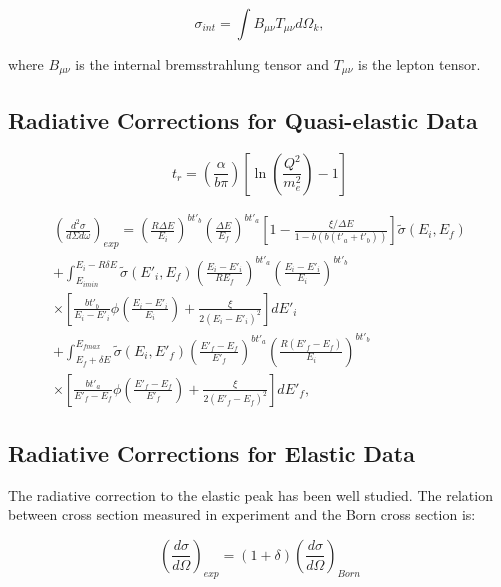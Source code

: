 \begin{equation}
\sigma_{int} = \int B_{\mu\nu} T_{\mu\nu} d\Omega_k,
\end{equation}

where $B_{\mu\nu}$ is the internal bremsstrahlung tensor and $T_{\mu\nu}$ is the lepton tensor.



\subsection{Radiative Corrections for Quasi-elastic Data}

\begin{equation}
t_r = \left(\frac{\alpha}{b\pi} \right) \left[ \ln\left(\frac{Q^2}{m_e^2}\right)-1 \right]
\end{equation}

\begin{equation}
\begin{split}
\left( \frac{d^2\sigma}{d\Sigma d\omega} \right)_{exp}  =  \left(\frac{R\Delta E}{E_i}\right)^{bt'_b}
\left(\frac{\Delta E}{E_f}\right)^{bt'_a} \left[1 - \frac{\xi/\Delta E}{1-b(b(t'_a + t'_b))} \right] \tilde{\sigma}(E_i,
E_f) \\
 + \int_{E_{i min}}^{E_i - R\delta E} \tilde{\sigma}(E'_i, E_f) \left( \frac{E_i - E'_i}{RE_f} \right)^{bt'_a} \left(
\frac{E_i - E'_i}{E_i}\right)^{bt'_b} \\
 \times \left[ \frac{bt'_b}{E_i - E'_i} \phi \left( \frac{E_i-E'_i}{E_i} \right) + \frac{\xi}{2(E_i - E'_i)^2} \right]
dE'_i  \\
 + \int_{E_f + \delta E}^{E_{f max}} \tilde{\sigma} (E_i, E'_f) \left( \frac{E'_f - E_f}{E'_f} \right)^{bt'_a} \left(
\frac{R(E'_f - E_f)}{E_i} \right)^{bt'_b} \\
 \times \left[ \frac{bt'_a}{E'_f-E_f} \phi\left(\frac{E'_f - E_f}{E'_f}\right)+\frac{\xi}{2(E'_f - E_f)^2} \right] dE'_f ,
%
\end{split}
\end{equation}

\subsection{Radiative Corrections for Elastic Data}
The radiative correction to the elastic peak has been well studied.
The relation between cross section measured in experiment and the Born cross section is:

\begin{equation}
\left(\frac{d\sigma}{d\Omega}\right)_{exp} = (1+\delta) \left( \frac{d\sigma}{d\Omega} \right)_{Born}
\end{equation}

